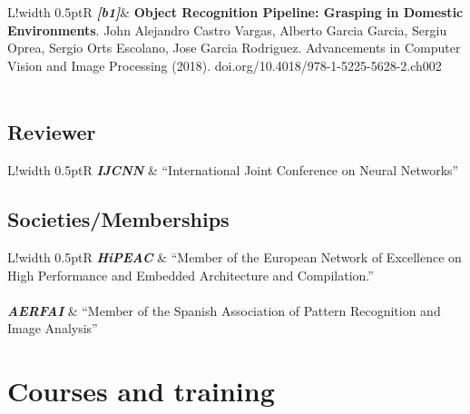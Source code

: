 \documentclass[8pt]{article}
\newcommand\VRule{\color{lightgray}\vrule width 0.5pt}
\begin{document}
\begin{tabular}{L!{\VRule}R}
\emph{\textbf{[b1]}}& \textbf{Object Recognition Pipeline: Grasping in Domestic Environments}. John Alejandro Castro Vargas, Alberto Garcia Garcia, Sergiu Oprea, Sergio Orts Escolano, Jose Garcia Rodriguez. Advancements in Computer Vision and Image Processing (2018). doi.org/10.4018/978-1-5225-5628-2.ch002 \\
\\
\end{tabular}

\subsection*{Reviewer}
\begin{tabular}{L!{\VRule}R}
	\textit{\textbf{IJCNN}} & “International Joint Conference on Neural Networks” \\
\end{tabular}

\subsection*{Societies/Memberships}
\begin{tabular}{L!{\VRule}R}
	\textit{\textbf{HiPEAC}} & “Member of the European Network of Excellence on High Performance and Embedded Architecture
	and Compilation.” \\
	\\
	\textit{\textbf{AERFAI}} & “Member of the Spanish Association of Pattern Recognition and Image Analysis” \\
\end{tabular}

\section*{Courses and training}
\end{document}
